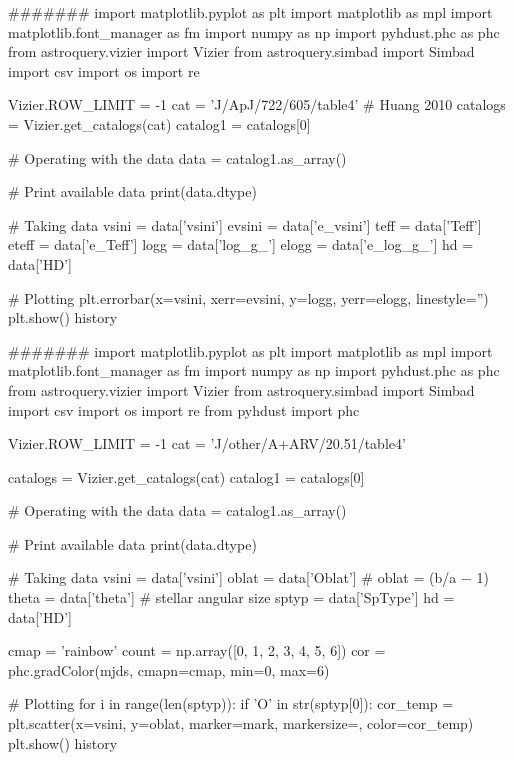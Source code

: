 #######
import matplotlib.pyplot as plt
import matplotlib as mpl
import matplotlib.font_manager as fm
import numpy as np
import pyhdust.phc as phc
from astroquery.vizier import Vizier
from astroquery.simbad import Simbad
import csv
import os
import re

Vizier.ROW_LIMIT = -1
cat = 'J/ApJ/722/605/table4'  # Huang 2010
catalogs = Vizier.get_catalogs(cat)
catalog1 = catalogs[0]

# Operating with the data
data = catalog1.as_array()

# Print available data
print(data.dtype)

# Taking data
vsini = data['vsini']
evsini = data['e_vsini']
teff = data['Teff']
eteff = data['e_Teff']
logg = data['log_g_']
elogg = data['e_log_g_']
hd = data['HD']

# Plotting
plt.errorbar(x=vsini, xerr=evsini, y=logg, yerr=elogg, linestyle='')
plt.show()
history


#######
import matplotlib.pyplot as plt
import matplotlib as mpl
import matplotlib.font_manager as fm
import numpy as np
import pyhdust.phc as phc
from astroquery.vizier import Vizier
from astroquery.simbad import Simbad
import csv
import os
import re
from pyhdust import phc

Vizier.ROW_LIMIT = -1
cat = 'J/other/A+ARV/20.51/table4'

catalogs = Vizier.get_catalogs(cat)
catalog1 = catalogs[0]

# Operating with the data
data = catalog1.as_array()

# Print available data
print(data.dtype)

# Taking data
vsini = data['vsini']
oblat = data['Oblat']  # oblat = (b/a − 1)
theta = data['theta']  # stellar angular size
sptyp = data['SpType']
hd = data['HD']

cmap = 'rainbow'
count = np.array([0, 1, 2, 3, 4, 5, 6])
cor = phc.gradColor(mjds, cmapn=cmap, min=0, max=6)

# Plotting
for i in range(len(sptyp)):
    if 'O' in str(sptyp[0]):
	cor_temp = 
	plt.scatter(x=vsini, y=oblat, marker=mark, markersize=, color=cor_temp)
plt.show()
history









